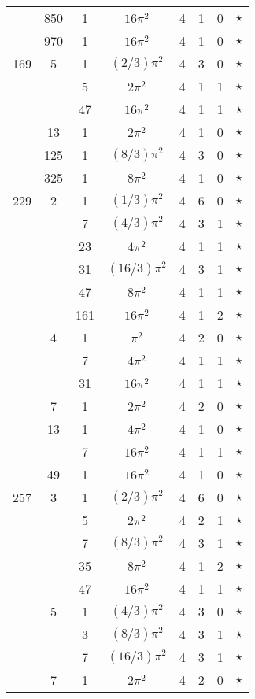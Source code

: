 \begin{tabular}{ccc|ccccc}
 & 850 & 1 & $16\pi^2$ & 4 & 1 & 0 & $\star$ \\
 & 970 & 1 & $16\pi^2$ & 4 & 1 & 0 & $\star$ \\
169 & 5 & 1 & $(2/3)\pi^2$ & 4 & 3 & 0 & $\star$ \\
 &  & 5 & $2\pi^2$ & 4 & 1 & 1 & $\star$ \\
 &  & 47 & $16\pi^2$ & 4 & 1 & 1 & $\star$ \\
 & 13 & 1 & $2\pi^2$ & 4 & 1 & 0 & $\star$ \\
 & 125 & 1 & $(8/3)\pi^2$ & 4 & 3 & 0 & $\star$ \\
 & 325 & 1 & $8\pi^2$ & 4 & 1 & 0 & $\star$ \\
229 & 2 & 1 & $(1/3)\pi^2$ & 4 & 6 & 0 & $\star$ \\
 &  & 7 & $(4/3)\pi^2$ & 4 & 3 & 1 & $\star$ \\
 &  & 23 & $4\pi^2$ & 4 & 1 & 1 & $\star$ \\
 &  & 31 & $(16/3)\pi^2$ & 4 & 3 & 1 & $\star$ \\
 &  & 47 & $8\pi^2$ & 4 & 1 & 1 & $\star$ \\
 &  & 161 & $16\pi^2$ & 4 & 1 & 2 & $\star$ \\
 & 4 & 1 & $\pi^2$ & 4 & 2 & 0 & $\star$ \\
 &  & 7 & $4\pi^2$ & 4 & 1 & 1 & $\star$ \\
 &  & 31 & $16\pi^2$ & 4 & 1 & 1 & $\star$ \\
 & 7 & 1 & $2\pi^2$ & 4 & 2 & 0 & $\star$ \\
 & 13 & 1 & $4\pi^2$ & 4 & 1 & 0 & $\star$ \\
 &  & 7 & $16\pi^2$ & 4 & 1 & 1 & $\star$ \\
 & 49 & 1 & $16\pi^2$ & 4 & 1 & 0 & $\star$ \\
257 & 3 & 1 & $(2/3)\pi^2$ & 4 & 6 & 0 & $\star$ \\
 &  & 5 & $2\pi^2$ & 4 & 2 & 1 & $\star$ \\
 &  & 7 & $(8/3)\pi^2$ & 4 & 3 & 1 & $\star$ \\
 &  & 35 & $8\pi^2$ & 4 & 1 & 2 & $\star$ \\
 &  & 47 & $16\pi^2$ & 4 & 1 & 1 & $\star$ \\
 & 5 & 1 & $(4/3)\pi^2$ & 4 & 3 & 0 & $\star$ \\
 &  & 3 & $(8/3)\pi^2$ & 4 & 3 & 1 & $\star$ \\
 &  & 7 & $(16/3)\pi^2$ & 4 & 3 & 1 & $\star$ \\
 & 7 & 1 & $2\pi^2$ & 4 & 2 & 0 & $\star$ \\

\end{tabular}
